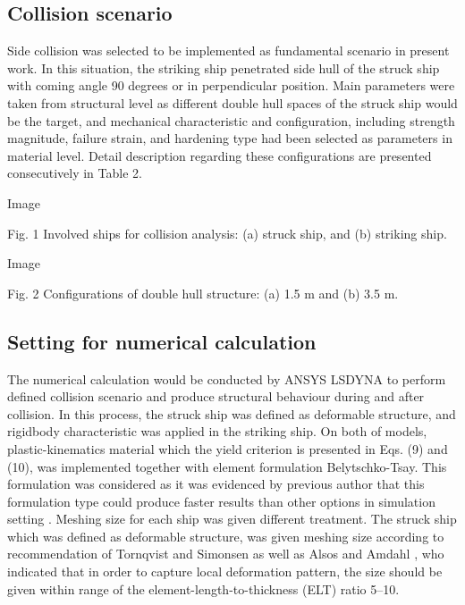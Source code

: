 \documentclass[10pt,journal]{IEEEtran}
\begin{document}
\subsection{Collision scenario}

Side collision was selected to be implemented as fundamental scenario in present work. 
In this situation, the striking ship penetrated side hull of the struck ship with coming angle 90 degrees or in perpendicular position. 
Main parameters were taken from structural level as different double hull spaces of the struck ship would be the target, and mechanical character­istic and configuration, including strength magnitude, 
failure strain, and hardening type had been selected as parameters in material level. Detail description regarding these configurations are presented consecutively in Table 2. 

Image

Fig. 1 Involved ships for collision analysis: (a) struck ship, and (b) striking ship. 

Image

Fig. 2 Configurations of double hull structure: (a) 1.5 m and (b) 3.5 m. 

\subsection{Setting for numerical calculation}

The numerical calculation would be conducted by ANSYS LS­DYNA \cite{ansys2017user} to perform defined collision scenario and produce structural behaviour during and after collision. 
In this process, the struck ship was defined as deformable structure, and rigid­body characteristic was applied in the striking ship. 
On both of models, plastic-kinematics material which the yield criterion is presented in Eqs. (9) and (10), was implemented together with element formulation Belytschko-Tsay. 
This formulation was considered as it was evidenced by previous author that this formulation type could produce faster results than other options in simulation setting \cite{bae2016study}. 
Meshing size for each ship was given different treatment. The struck ship which was defined as deformable structure, was given meshing size according to rec­ommendation of Tornqvist and Simonsen \cite{toernqvist2004safety}
as well as Alsos and Amdahl \cite{alsos2007resistance}, who indicated that in order to capture local deformation pattern, the size should be given within range of the element-length-to-thickness (ELT) ratio 5–10.
\end{document}
